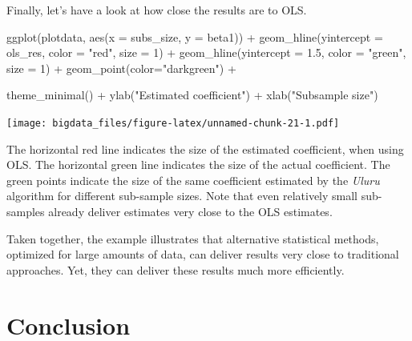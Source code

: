 \documentclass[
  12pt,
]{style/krantz}
\newenvironment{Shaded}{\begin{snugshade}}{\end{snugshade}}
\newcommand{\AttributeTok}[1]{\textcolor[rgb]{0.77,0.63,0.00}{#1}}
\newcommand{\DecValTok}[1]{\textcolor[rgb]{0.00,0.00,0.81}{#1}}
\newcommand{\FloatTok}[1]{\textcolor[rgb]{0.00,0.00,0.81}{#1}}
\newcommand{\FunctionTok}[1]{\textcolor[rgb]{0.00,0.00,0.00}{#1}}
\newcommand{\NormalTok}[1]{#1}
\newcommand{\SpecialCharTok}[1]{\textcolor[rgb]{0.00,0.00,0.00}{#1}}
\newcommand{\StringTok}[1]{\textcolor[rgb]{0.31,0.60,0.02}{#1}}
\begin{document}
Finally, let's have a look at how close the results are to OLS.

\begin{Shaded}
\begin{Highlighting}[]
\FunctionTok{ggplot}\NormalTok{(plotdata, }\FunctionTok{aes}\NormalTok{(}\AttributeTok{x =}\NormalTok{ subs\_size, }\AttributeTok{y =}\NormalTok{ beta1)) }\SpecialCharTok{+}
     \FunctionTok{geom\_hline}\NormalTok{(}\AttributeTok{yintercept =}\NormalTok{ ols\_res,}
                \AttributeTok{color =} \StringTok{"red"}\NormalTok{, }
                \AttributeTok{size =} \DecValTok{1}\NormalTok{) }\SpecialCharTok{+}
       \FunctionTok{geom\_hline}\NormalTok{(}\AttributeTok{yintercept =} \FloatTok{1.5}\NormalTok{,}
                \AttributeTok{color =} \StringTok{"green"}\NormalTok{,}
                \AttributeTok{size =} \DecValTok{1}\NormalTok{) }\SpecialCharTok{+}
     \FunctionTok{geom\_point}\NormalTok{(}\AttributeTok{color=}\StringTok{"darkgreen"}\NormalTok{) }\SpecialCharTok{+} 

     \FunctionTok{theme\_minimal}\NormalTok{() }\SpecialCharTok{+}
     \FunctionTok{ylab}\NormalTok{(}\StringTok{"Estimated coefficient"}\NormalTok{) }\SpecialCharTok{+}
     \FunctionTok{xlab}\NormalTok{(}\StringTok{"Subsample size"}\NormalTok{)}
\end{Highlighting}
\end{Shaded}

\texttt{[image: bigdata\_files/figure-latex/unnamed-chunk-21-1.pdf]}

The horizontal red line indicates the size of the estimated coefficient, when using OLS. The horizontal green line indicates the size of the actual coefficient. The green points indicate the size of the same coefficient estimated by the \emph{Uluru} algorithm for different sub-sample sizes. Note that even relatively small sub-samples already deliver estimates very close to the OLS estimates.

Taken together, the example illustrates that alternative statistical methods, optimized for large amounts of data, can deliver results very close to traditional approaches. Yet, they can deliver these results much more efficiently.

\hypertarget{conclusion}{%
\section{Conclusion}\label{conclusion}}
\end{document}
